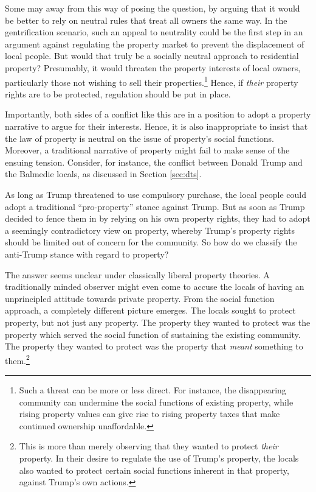 Some may  away from this way of posing the question, by arguing that it would be better to rely on neutral rules that treat all owners the same way. In the gentrification scenario, such an appeal to neutrality could be the first step in an argument against regulating the property market to prevent the displacement of local people. But would that truly be a socially neutral approach to residential property? Presumably, it would threaten the property interests of local owners, particularly those not wishing to sell their properties.\footnote{Such a threat can be more or less direct. For instance, the disappearing community can undermine the social functions of existing property, while rising property values can give rise to rising property taxes that make continued ownership unaffordable.} Hence, if {\it their} property rights are to be protected, regulation should be put in place.

Importantly, both sides of a conflict like this are in a position to adopt a property narrative to argue for their interests. Hence, it is also inappropriate to insist that the law of property is neutral on the issue of property's social functions. Moreover, a traditional narrative of property might fail to make sense of the ensuing tension. Consider, for instance, the conflict between Donald Trump and the Balmedie locals, as discussed in Section \ref{sec:dts}.

As long as Trump threatened to use compulsory purchase, the local people could adopt a traditional ``pro-property'' stance against Trump. But as soon as Trump decided to fence them in by relying on his own property rights, they had to adopt a seemingly contradictory view on property, whereby Trump's property rights should be limited out of concern for the community. So how do we classify the anti-Trump stance with regard to property?

The answer seems unclear under classically liberal property theories. A traditionally minded observer might even come to accuse the locals of having an unprincipled attitude towards private property. From the social function approach, a completely different picture emerges. The locals sought to protect property, but not just any property. The property they wanted to protect was the property which served the social function of sustaining the existing community. The property they wanted to protect was the property that {\it meant} something to them.\footnote{This is more than merely observing that they wanted to protect {\it their} property. In their desire to regulate the use of Trump's property, the locals also wanted to protect certain social functions inherent in that property, against Trump's own actions.}

